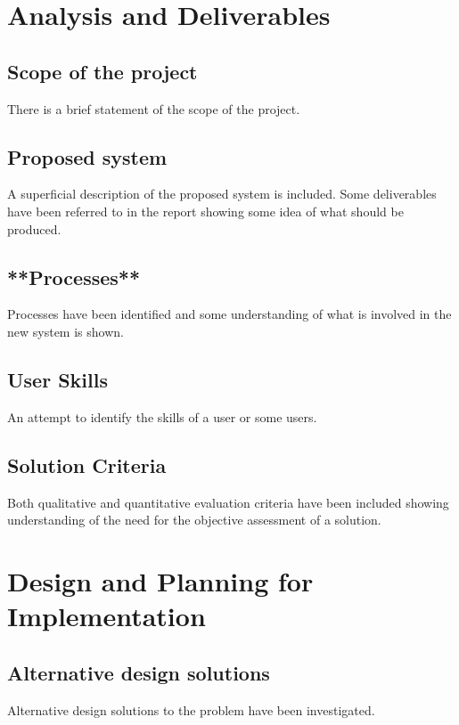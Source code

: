 \documentclass[a4paper]{article}
\begin{document}
\section{Analysis and Deliverables}

	\subsection{Scope of the project}
	There is a brief statement of the scope of the project.

	\subsection{Proposed system}
	A superficial description of the proposed system is included.
    Some deliverables have been referred to in the report showing some idea of what should be produced.

 	\subsection{**Processes**}
	Processes have been identified and some understanding of what is involved in the new system is shown.

	\subsection{User Skills}
	An attempt to identify the skills of a user or some users.

	\subsection{Solution Criteria}
	Both qualitative and quantitative evaluation criteria have been included showing understanding of the need for the objective assessment of a solution.

\section{Design and Planning for Implementation}

	\subsection{Alternative design solutions}
	Alternative design solutions to the problem have been investigated.

\subsection{}
\end{document}
